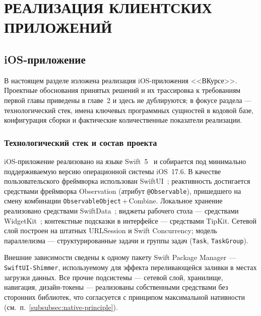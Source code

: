 
\clearpage
\section{РЕАЛИЗАЦИЯ КЛИЕНТСКИХ ПРИЛОЖЕНИЙ}

\subsection{iOS-приложение}
\label{subsec:impl-ios}

В настоящем разделе изложена реализация iOS-приложения <<ВКурсе>>. Проектные обоснования принятых решений и их трассировка к требованиям первой главы приведены в главе~2 и здесь не дублируются; в фокусе раздела --- технологический стек, имена ключевых программных сущностей в кодовой базе, конфигурация сборки и фактические количественные показатели реализации.

\subsubsection{Технологический стек и состав проекта}
\label{subsubsec:impl-ios-stack}

iOS-приложение реализовано на языке Swift~5~\cite{usov-swift, apple-swift-book} и собирается под минимально поддерживаемую версию операционной системы iOS~17.6. В качестве пользовательского фреймворка использован SwiftUI~\cite{apple-swiftui}; реактивность достигается средствами фреймворка Observation (атрибут \texttt{@Observable}), пришедшего на смену комбинации \texttt{ObservableObject}\,+\,Combine. Локальное хранение реализовано средствами SwiftData~\cite{apple-swiftdata}; виджеты рабочего стола --- средствами WidgetKit~\cite{apple-widgetkit}; контекстные подсказки в интерфейсе --- средствами TipKit. Сетевой слой построен на штатных URLSession и Swift Concurrency; модель параллелизма --- структурированные задачи и группы задач (\texttt{Task}, \texttt{TaskGroup}).

Внешние зависимости сведены к одному пакету Swift Package Manager --- \texttt{SwiftUI-Shimmer}, используемому для эффекта переливающейся заливки в местах загрузки данных. Все прочие подсистемы --- сетевой слой, хранилище, навигация, дизайн-токены --- реализованы собственными средствами без сторонних библиотек, что согласуется с принципом максимальной нативности (см.~п.~\ref{subsubsec:native-principle}).

